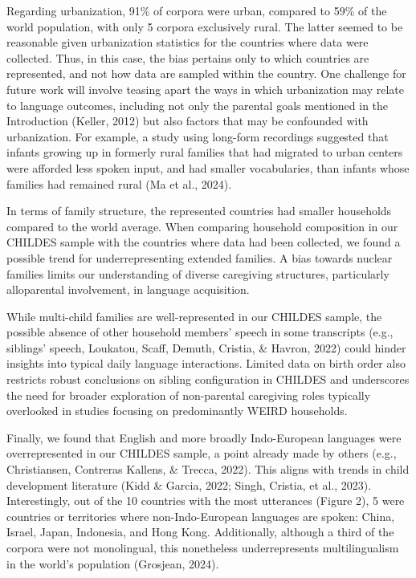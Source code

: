 \documentclass[
  man,floatsintext]{apa6}
\begin{document}
Regarding urbanization, 91\% of corpora were urban, compared to 59\% of the world population, with only 5 corpora exclusively rural. The latter seemed to be reasonable given urbanization statistics for the countries where data were collected. Thus, in this case, the bias pertains only to which countries are represented, and not how data are sampled within the country. One challenge for future work will involve teasing apart the ways in which urbanization may relate to language outcomes, including not only the parental goals mentioned in the Introduction (Keller, 2012) but also factors that may be confounded with urbanization. For example, a study using long-form recordings suggested that infants growing up in formerly rural families that had migrated to urban centers were afforded less spoken input, and had smaller vocabularies, than infants whose families had remained rural (Ma et al., 2024).

In terms of family structure, the represented countries had smaller households compared to the world average. When comparing household composition in our CHILDES sample with the countries where data had been collected, we found a possible trend for underrepresenting extended families. A bias towards nuclear families limits our understanding of diverse caregiving structures, particularly alloparental involvement, in language acquisition.

While multi-child families are well-represented in our CHILDES sample, the possible absence of other household members' speech in some transcripts (e.g., siblings' speech, Loukatou, Scaff, Demuth, Cristia, \& Havron, 2022) could hinder insights into typical daily language interactions. Limited data on birth order also restricts robust conclusions on sibling configuration in CHILDES and underscores the need for broader exploration of non-parental caregiving roles typically overlooked in studies focusing on predominantly WEIRD households.

Finally, we found that English and more broadly Indo-European languages were overrepresented in our CHILDES sample, a point already made by others (e.g., Christiansen, Contreras Kallens, \& Trecca, 2022). This aligns with trends in child development literature (Kidd \& Garcia, 2022; Singh, Cristia, et al., 2023). Interestingly, out of the 10 countries with the most utterances (Figure 2), 5 were countries or territories where non-Indo-European languages are spoken: China, Israel, Japan, Indonesia, and Hong Kong. Additionally, although a third of the corpora were not monolingual, this nonetheless underrepresents multilingualism in the world's population (Grosjean, 2024).
\end{document}
